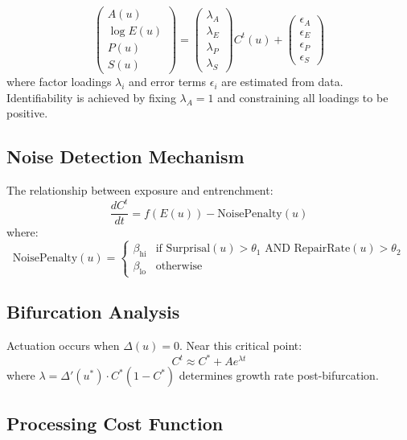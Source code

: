 \documentclass[12pt]{article}
\begin{document}
\[
\begin{pmatrix}
A(u) \\
\log E(u) \\
P(u) \\
S(u)
\end{pmatrix}
=
\begin{pmatrix}
\lambda_A \\
\lambda_E \\
\lambda_P \\
\lambda_S
\end{pmatrix}
C^t(u) +
\begin{pmatrix}
\epsilon_A \\
\epsilon_E \\
\epsilon_P \\
\epsilon_S
\end{pmatrix}
\]
where factor loadings $\lambda_i$ and error terms $\epsilon_i$ are estimated from data. Identifiability is achieved by fixing $\lambda_A = 1$ and constraining all loadings to be positive.

\subsection{Noise Detection Mechanism}

The relationship between exposure and entrenchment:
\[
\frac{dC^t}{dt} = f(E(u)) - \text{NoisePenalty}(u)
\]
where:
\[
\text{NoisePenalty}(u) = \begin{cases}
\beta_{\mathrm{hi}} & \text{if } \text{Surprisal}(u) > \theta_1 \text{ AND } \text{RepairRate}(u) > \theta_2 \\
\beta_{\mathrm{lo}} & \text{otherwise}
\end{cases}
\]

\subsection{Bifurcation Analysis}

Actuation occurs when $\Delta(u) = 0$. Near this critical point:
\[
C^t \approx C^* + A e^{\lambda t}
\]
where $\lambda = \Delta'(u^*) \cdot C^*(1-C^*)$ determines growth rate post-bifurcation.

\subsection{Processing Cost Function}
\end{document}

